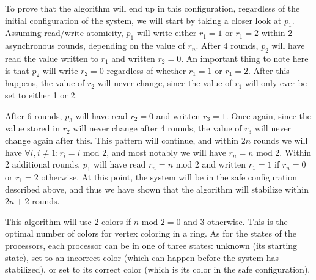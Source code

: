 \documentclass{article}
\begin{document}
To prove that the algorithm will end up in this configuration, regardless of the initial configuration of the system, we will start by taking a closer look at $p_1$. Assuming read/write atomicity, $p_1$ will write either $r_1 = 1$ or $r_1 = 2$ within 2 asynchronous rounds, depending on the value of $r_n$. After 4 rounds, $p_2$ will have read the value written to $r_1$ and written $r_2 = 0$. An important thing to note here is that $p_2$ will write $r_2 = 0$ regardless of whether $r_1 = 1$ or $r_1 = 2$. After this happens, the value of $r_2$ will never change, since the value of $r_1$ will only ever be set to either 1 or 2.

After 6 rounds, $p_3$ will have read $r_2 = 0$ and written $r_3 = 1$. Once again, since the value stored in $r_2$ will never change after 4 rounds, the value of $r_3$ will never change again after this. This pattern will continue, and within $2n$ rounds we will have $\forall i, i \neq 1 : r_i = i \text{ mod } 2$, and most notably we will have $r_n = n \text{ mod } 2$. Within 2 additional rounds, $p_1$ will have read $r_n = n \text{ mod } 2$ and written $r_1 = 1$ if $r_n = 0$ or $r_1 = 2$ otherwise. At this point, the system will be in the safe configuration described above, and thus we have shown that the algorithm will stabilize within $2n+2$ rounds.

This algorithm will use 2 colors if $n \text{ mod } 2 = 0$ and 3 otherwise. This is the optimal number of colors for vertex coloring in a ring. As for the states of the processors, each processor can be in one of three states: unknown (its starting state), set to an incorrect color (which can happen before the system has stabilized), or set to its correct color (which is its color in the safe configuration).
\end{document}
